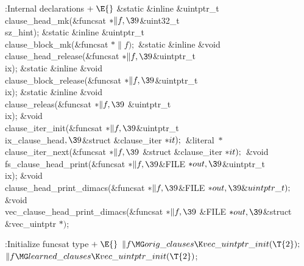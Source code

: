 \Y\B\4:Internal declarations\X${}\mathrel+\E{}$\6
\&{static} \&{inline} \&{uintptr\_t} \\{clause\_head\_mk}(\&{funcsat} ${}{*}%
\|f,\39{}$\&{uint32\_t} \\{sz\_hint});\6
\&{static} \&{inline} \&{uintptr\_t} \\{clause\_block\_mk}(\&{funcsat} ${}{*}%
\|f);{}$\6
\&{static} \&{inline} \&{void} \\{clause\_head\_release}(\&{funcsat} ${}{*}\|f,%
\39{}$\&{uintptr\_t} \\{ix});\6
\&{static} \&{inline} \&{void} \\{clause\_block\_release}(\&{funcsat} ${}{*}%
\|f,\39{}$\&{uintptr\_t} \\{ix});\6
\&{static} \&{inline} \&{void} \\{clause\_releas}(\&{funcsat} ${}{*}\|f,\39{}$%
\&{uintptr\_t} \\{ix});\6
\&{void} \\{clause\_iter\_init}(\&{funcsat} ${}{*}\|f,\39{}$\&{uintptr\_t} %
\\{ix\_clause\_head}${},\39{}$\&{struct} \&{clause\_iter} ${}{*}\\{it});{}$\6
\&{literal} ${}{*}{}$\\{clause\_iter\_next}(\&{funcsat} ${}{*}\|f,\39{}$%
\&{struct} \&{clause\_iter} ${}{*}\\{it});{}$\6
\&{void} \\{fs\_clause\_head\_print}(\&{funcsat} ${}{*}\|f,\39{}$\&{FILE}
${}{*}\\{out},\39{}$\&{uintptr\_t} \\{ix});\6
\&{void} \\{clause\_head\_print\_dimacs}(\&{funcsat} ${}{*}\|f,\39{}$\&{FILE}
${}{*}\\{out},\39\&{uintptr\_t});{}$\6
\&{void} \\{vec\_clause\_head\_print\_dimacs}(\&{funcsat} ${}{*}\|f,\39{}$%
\&{FILE} ${}{*}\\{out},\39{}$\&{struct} \&{vec\_uintptr} ${}{*}){}$;\par
\fi

\Y\B\4:Initialize funcsat type\X${}\mathrel+\E{}$\6
$\|f\MG\\{orig\_clauses}\K\\{vec\_uintptr\_init}(\T{2});{}$\6
${}\|f\MG\\{learned\_clauses}\K\\{vec\_uintptr\_init}(\T{2}){}$;\par
\fi

